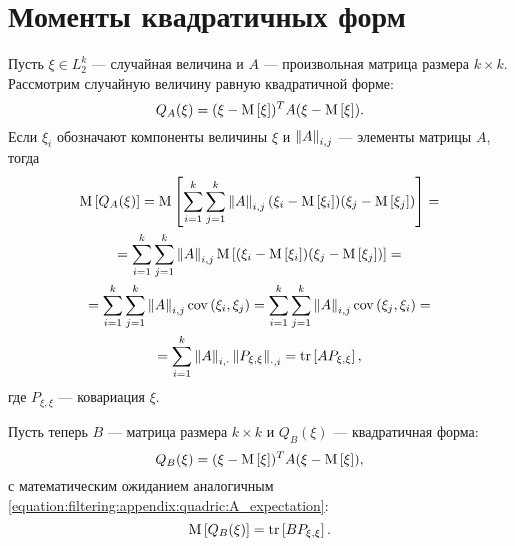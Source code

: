 \section{Моменты квадратичных форм}

Пусть $\xi \in L_2^k$ --- случайная величина и $A$ --- произвольная матрица размера $k \times k$. Рассмотрим случайную величину равную квадратичной форме:
$$
    Q_A(\xi) = ( \xi - \mathrm{M} \left [ \xi \right ] )^T A ( \xi - \mathrm{M} \left [ \xi \right ] ) .
$$
Если $\xi_i$ обозначают компоненты величины $\xi$ и $\left \| A \right \|_{i,j}$ --- элементы матрицы $A$, тогда
\begin{multline} \label{equation:filtering:appendix:quadric:A_expectation}
    \mathrm{M} \left [ Q_A(\xi) \right ]
        = \mathrm{M} \left [ \sum_{i=1}^k \sum_{j=1}^k \left \| A \right \|_{i,j} (\xi_i - \mathrm{M} \left [ \xi_i \right ]) (\xi_j - \mathrm{M} \left [ \xi_j \right ]) \right ] = \\
    = \sum_{i=1}^k \sum_{j=1}^k \left \| A \right \|_{i,j} \mathrm{M} \left [ (\xi_i - \mathrm{M} \left [ \xi_i \right ]) (\xi_j - \mathrm{M} \left [ \xi_j \right ]) \right ] = \\
    = \sum_{i=1}^k \sum_{j=1}^k \left \| A \right \|_{i,j} \mathrm{cov} \left ( \xi_i, \xi_j \right )
        = \sum_{i=1}^k \sum_{j=1}^k \left \| A \right \|_{i,j} \mathrm{cov} \left ( \xi_j, \xi_i \right ) = \\
    = \sum_{i=1}^k \left \| A \right \|_{i, \cdot} \left \| P_{\xi,\xi} \right \|_{\cdot, i} = \mathrm{tr} \left [ A P_{\xi,\xi} \right ]
    ,
\end{multline}
где $P_{\xi,\xi}$ --- ковариация $\xi$.

Пусть теперь $B$ --- матрица размера $k \times k$ и $Q_B(\xi)$ --- квадратичная форма:
$$
    Q_B(\xi) = ( \xi - \mathrm{M} \left [ \xi \right ] )^T A ( \xi - \mathrm{M} \left [ \xi \right ] ) ,
$$
с математическим ожиданием аналогичным \eqref{equation:filtering:appendix:quadric:A_expectation}: 
\begin{equation} \label{equation:filtering:appendix:quadric:B_expectation}
    \mathrm{M} \left [ Q_B(\xi) \right ] = \mathrm{tr} \left [ B P_{\xi,\xi} \right ] .
\end{equation}

